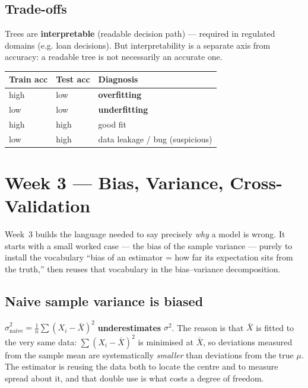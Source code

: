 \documentclass[11pt, a4paper]{article}
\newcommand{\thead}[1]{\textbf{#1}}
\newcommand{\kw}[1]{\textbf{#1}}
\begin{document}
\subsection{Trade-offs}

\begin{pitfallbox}
Trees are \kw{interpretable} (readable decision path) — required in regulated domains (e.g. loan
decisions). But interpretability is a separate axis from accuracy: a readable tree is not necessarily
an accurate one.
\end{pitfallbox}

\begin{center}
\renewcommand{\arraystretch}{1.2}
\begin{tabularx}{\linewidth}{l l X}
\toprule
\thead{Train acc} & \thead{Test acc} & \thead{Diagnosis} \\
\midrule
high & low & \kw{overfitting} \\
low & low & \kw{underfitting} \\
high & high & good fit \\
low & high & data leakage / bug (suspicious) \\
\bottomrule
\end{tabularx}
\end{center}

\section{Week 3 — Bias, Variance, Cross-Validation}

Week~3 builds the language needed to say precisely \emph{why} a model is wrong. It starts with a
small worked case — the bias of the sample variance — purely to install the vocabulary ``bias of an
estimator = how far its expectation sits from the truth,'' then reuses that vocabulary in the
bias--variance decomposition.

\subsection{Naive sample variance is biased}

$\hat\sigma^2_{\text{naive}}=\tfrac1n\sum(X_i-\bar X)^2$ \kw{underestimates} $\sigma^2$. The reason
is that $\bar X$ is fitted to the very same data: $\sum(X_i-\bar X)^2$ is minimised at $\bar X$, so
deviations measured from the sample mean are systematically \emph{smaller} than deviations from the
true $\mu$. The estimator is reusing the data both to locate the centre and to measure spread about
it, and that double use is what costs a degree of freedom.
\end{document}
